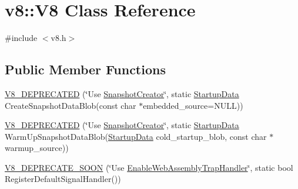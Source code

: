 \hypertarget{classv8_1_1V8}{}\section{v8\+:\+:V8 Class Reference}
\label{classv8_1_1V8}


{\ttfamily \#include $<$v8.\+h$>$}

\subsection*{Public Member Functions}
\begin{DoxyCompactItemize}
\item 
\mbox{\hyperlink{classv8_1_1V8_a18084f04050024b3e266277412737282}{V8\+\_\+\+D\+E\+P\+R\+E\+C\+A\+T\+ED}} (\char`\"{}Use \mbox{\hyperlink{classv8_1_1SnapshotCreator}{Snapshot\+Creator}}\char`\"{}, static \mbox{\hyperlink{classv8_1_1StartupData}{Startup\+Data}} Create\+Snapshot\+Data\+Blob(const char $\ast$embedded\+\_\+source=N\+U\+LL))
\item 
\mbox{\hyperlink{classv8_1_1V8_ac6020fb485b53eb8e5a6c1e3a8cbee63}{V8\+\_\+\+D\+E\+P\+R\+E\+C\+A\+T\+ED}} (\char`\"{}Use \mbox{\hyperlink{classv8_1_1SnapshotCreator}{Snapshot\+Creator}}\char`\"{}, static \mbox{\hyperlink{classv8_1_1StartupData}{Startup\+Data}} Warm\+Up\+Snapshot\+Data\+Blob(\mbox{\hyperlink{classv8_1_1StartupData}{Startup\+Data}} cold\+\_\+startup\+\_\+blob, const char $\ast$warmup\+\_\+source))
\item 
\mbox{\hyperlink{classv8_1_1V8_a4e1339bb218a43e6776dea1a20340115}{V8\+\_\+\+D\+E\+P\+R\+E\+C\+A\+T\+E\+\_\+\+S\+O\+ON}} (\char`\"{}Use \mbox{\hyperlink{classv8_1_1V8_a3a21191d183bf7b1235d029e6fdf438f}{Enable\+Web\+Assembly\+Trap\+Handler}}\char`\"{}, static bool Register\+Default\+Signal\+Handler())
\end{DoxyCompactItemize}
